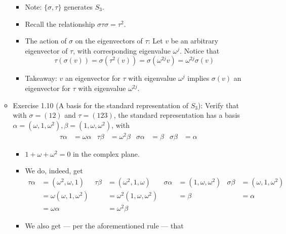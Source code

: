 \documentclass[../notes.tex]{subfiles}
\begin{document}
\begin{itemize}
\begin{itemize}
\begin{itemize}
            \item Note: $\{\sigma,\tau\}$ generates $S_3$.
            \item Recall the relationship $\sigma\tau\sigma=\tau^2$.
            \item The action of $\sigma$ on the eigenvectors of $\tau$: Let $v$ be an arbitrary eigenvector of $\tau$, with corresponding eigenvalue $\omega^j$. Notice that
            \begin{equation*}
                \tau(\sigma(v)) = \sigma(\tau^2(v))
                = \sigma(\omega^{2j}v)
                = \omega^{2j}\sigma(v)
            \end{equation*}
            \item Takeaway: $v$ an eigenvector for $\tau$ with eigenvalue $\omega^j$ implies $\sigma(v)$ an eigenvector for $\tau$ with eigenvalue $\omega^{2j}$.
        \end{itemize}
        \item Exercise 1.10 (A basis for the standard representation of $S_3$): Verify that with $\sigma=(12)$ and $\tau=(123)$, the standard representation has a basis $\alpha=(\omega,1,\omega^2),\beta=(1,\omega,\omega^2)$, with
        \begin{align*}
            \tau\alpha &= \omega\alpha&
            \tau\beta &= \omega^2\beta&
            \sigma\alpha &= \beta&
            \sigma\beta &= \alpha
        \end{align*}
        \begin{itemize}
            \item $1+\omega+\omega^2=0$ in the complex plane.
            \item We do, indeed, get
            \begin{align*}
                \tau\alpha &= (\omega^2,\omega,1)&
                    \tau\beta &= (\omega^2,1,\omega)&
                        \sigma\alpha &= (1,\omega,\omega^2)&
                            \sigma\beta &= (\omega,1,\omega^2)\\
                &= \omega(\omega,1,\omega^2)&
                    &= \omega^2(1,\omega,\omega^2)&
                        &= \beta&
                            &= \alpha\\
                &= \omega\alpha&
                    &= \omega^2\beta
            \end{align*}
            \item We also get --- per the aforementioned rule --- that
            \begin{equation*}

\end{equation*}
\end{itemize}
\end{itemize}
\end{itemize}
\end{document}
